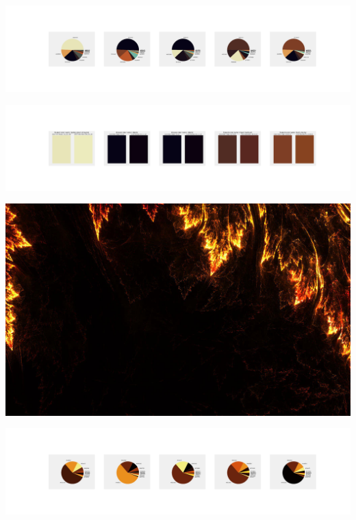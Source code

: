 \documentclass[11pt]{article}
\begin{document}
\begin{landscape}
    \begin{center}
    \includegraphics[width=250mm]{./nbimg/pie-426.jpg}
    \end{center}

    \begin{center}
    \includegraphics[width=250mm]{./nbimg/peak-426.jpg}
    \end{center}
    

    \begin{center}
    \includegraphics[width=\textwidth]{./nbimg/file (78).jpg}
    \end{center}

    \begin{center}
    \includegraphics[width=250mm]{./nbimg/pie-427.jpg}
    \end{center}


\end{landscape}
\end{document}
